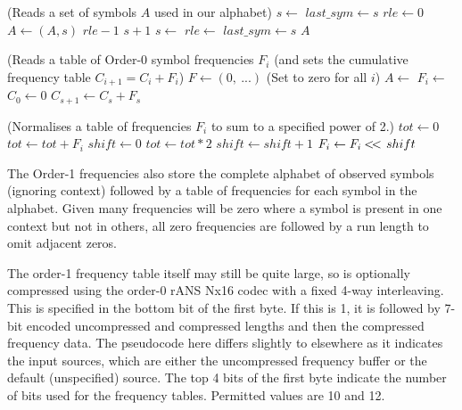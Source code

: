 \documentclass[a4paper]{article}
\begin{document}
\begin{algorithmic}[1]
\Statex (Reads a set of symbols $A$ used in our alphabet)
\State $s \gets$ 
\State $last\_sym \gets s$
\State $rle \gets 0$
\Repeat
  \State $A \gets (A,s)$ 
    \settowidth{\maxwidth}{rle\ }
    \State {} $rle-1$
    \State {} $s+1$
  \Else
    \State $s \gets$ 
      \State $rle \gets$ 
    \EndIf
  \EndIf
  \State $last\_sym \gets s$
\State \Return $A$
\EndFunction
\end{algorithmic}

\vskip 0.5cm

\begin{algorithmic}[1]
\Statex (Reads a table of Order-0 symbol frequencies $F_i$
\Statex (and sets the cumulative frequency table $C_{i+1} = C_i+F_i$)
\State $F \gets (0,\ ...)$ \Comment(Set to zero for all $i$)
\State $A \gets$ 
  \State $F_i \gets$ 
\EndForeach
\State
\State {}
\State
\State $C_0 \gets 0$
  \State $C_{s+1} \gets C_s + F_s$
\EndFor
\EndProcedure
\end{algorithmic}

\begin{algorithmic}[1]
\Statex (Normalises a table of frequencies $F_i$ to sum to a specified power of 2.)
\State $tot \gets 0$
  \State $tot \gets tot + F_i$
\EndFor
{}
  \State \Return
\EndIf
\State
\State $shift \gets 0$
  \State $tot \gets tot*2$
  \State $shift \gets shift+1$
\EndWhile
\State
{}
  \State $F_i \gets F_i \mathbin{<\mkern-3mu<\,} shift$
\EndFor
\EndProcedure
\end{algorithmic}

The Order-1 frequencies also store the complete alphabet of
observed symbols (ignoring context) followed by a table of frequencies for
each symbol in the alphabet.  Given many frequencies will be zero
where a symbol is present in one context but not in others, all zero
frequencies are followed by a run length to omit adjacent zeros.

The order-1 frequency table itself may still be quite large, so is
optionally compressed using the order-0 rANS Nx16 codec with a fixed
4-way interleaving.
This is specified in the bottom bit of the first byte.  If this is 1, it is
followed by 7-bit encoded uncompressed and compressed lengths and then
the compressed frequency data.  The pseudocode here differs slightly
to elsewhere as it indicates the input sources, which are either the
uncompressed frequency buffer or the default (unspecified) source.
The top 4 bits of the first byte indicate the number of bits used for
the frequency tables.  Permitted values are 10 and 12.
\end{document}
